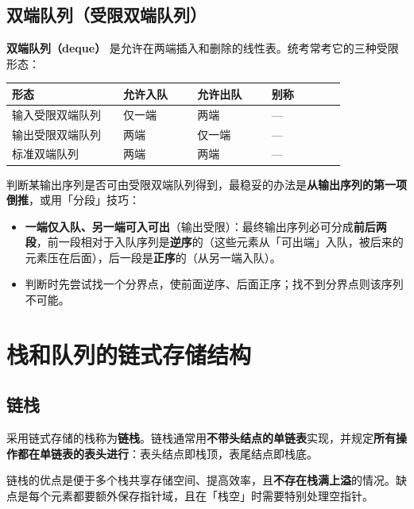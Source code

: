 \documentclass[11pt,openany,UTF8]{ctexbook}
\begin{document}
\subsection{双端队列（受限双端队列）}

\textbf{双端队列（deque）} 是允许在两端插入和删除的线性表。统考常考它的三种受限形态：

\begingroup\small\setlength{\tabcolsep}{4.0pt}
\begin{longtable}{@{}L{0.3038\linewidth}L{0.2025\linewidth}L{0.2025\linewidth}L{0.2025\linewidth}@{}}
\toprule
\textbf{形态} & \textbf{允许入队} & \textbf{允许出队} & \textbf{别称} \\
\midrule
\endhead
输入受限双端队列 & 仅一端 & 两端 & — \\
输出受限双端队列 & 两端 & 仅一端 & — \\
标准双端队列 & 两端 & 两端 & — \\
\bottomrule
\end{longtable}
\endgroup

判断某输出序列是否可由受限双端队列得到，最稳妥的办法是\textbf{从输出序列的第一项倒推}，或用「分段」技巧：

\begin{itemize}
\item \textbf{一端仅入队、另一端可入可出}（输出受限）：最终输出序列必可分成\textbf{前后两段}，前一段相对于入队序列是\textbf{逆序}的（这些元素从「可出端」入队，被后来的元素压在后面），后一段是\textbf{正序}的（从另一端入队）。
\item 判断时先尝试找一个分界点，使前面逆序、后面正序；找不到分界点则该序列不可能。
\end{itemize}
\section{栈和队列的链式存储结构}

\subsection{链栈}

采用链式存储的栈称为\textbf{链栈}。链栈通常用\textbf{不带头结点的单链表}实现，并规定\textbf{所有操作都在单链表的表头进行}：表头结点即栈顶，表尾结点即栈底。

链栈的优点是便于多个栈共享存储空间、提高效率，且\textbf{不存在栈满上溢}的情况。缺点是每个元素都要额外保存指针域，且在「栈空」时需要特别处理空指针。
\end{document}
